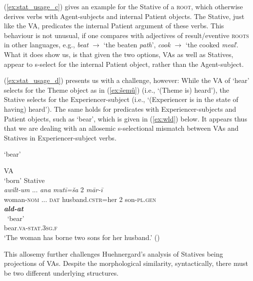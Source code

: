 \documentclass[output=paper,colorlinks,citecolor=brown]{langscibook}
\begin{document}
(\ref{ex:stat_usage_c}) gives an example for the Stative of a \textsc{root}, which otherwise derives  verbs with Agent-subjects and internal Patient objects. The Stative, just like the VA, predicates the internal Patient argument of these verbs. This behaviour is not unusual, if one compares with adjectives of result/eventive \textsc{roots} in other languages, e.g., \textit{beat} $\rightarrow$ `the beaten \textit{path}', \textit{cook} $\rightarrow$ `the cooked \textit{meal}'. What it does show us, is that given the two options, VAs as well as Statives, appear to s-select for the internal Patient object, rather than the Agent-subject.

(\ref{ex:stat_usage_d}) presents us with a challenge, however: While the VA of  `hear' selects for the Theme object as in (\ref{ex:šemû}) (i.e.,  `(Theme is) heard'), the Stative selects for the Experiencer-subject (i.e.,  `(Experiencer is in the state of having) heard'). The same holds for predicates with Experiencer-subjects and Patient objects, such as  `bear', which is given in (\ref{ex:wld}) below. It appears thus that we are dealing with an allosemic s-selectional mismatch between VAs and Statives in Experiencer-subject verbs.

\begin{exe}  \ex {} `bear' \label{ex:wld}
\begin{xlist}
        \ex VA\\
         `born'
    \ex Stative\\ \gll  \textit{awilt-um} ... \textit{ana} \textit{mutī=ša} 2 \textit{mār-ī}\\ 
    woman-\textsc{nom} ... \textsc{dat} husband.\textsc{cstr}=her 2 son-\textsc{pl.gen}\\
    \glll \textit{\textbf{ald-at}} \\
  ~`bear'\\
    bear.\textsc{va-stat.3sg.f}\\
    \glt `The woman has borne two sons for her husband.' ()\label{ex:aldat}
\end{xlist}
\end{exe}

 This allosemy further challenges Huehnergard's analysis of Statives being projections of VAs. Despite the morphological similarity, syntactically, there must be two different underlying structures. 
\end{document}
